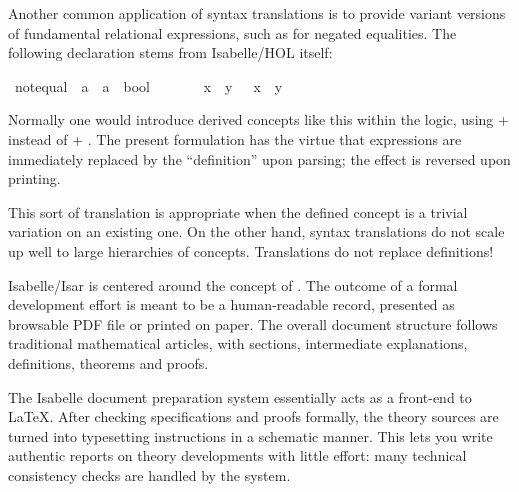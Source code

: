 \begin{isabellebody}
\begin{isamarkuptext}
  \medskip Another common application of syntax translations is to
  provide variant versions of fundamental relational expressions, such
  as \isa{{\isasymnoteq}} for negated equalities.  The following declaration
  stems from Isabelle/HOL itself:%
\end{isamarkuptext}%
\isamarkuptrue%
\isamarkupfalse%
\ {\isachardoublequoteopen}{\isacharunderscore}not{\isacharunderscore}equal{\isachardoublequoteclose}\ {\isacharcolon}{\isacharcolon}\ {\isachardoublequoteopen}{\isacharprime}a\ {\isasymRightarrow}\ {\isacharprime}a\ {\isasymRightarrow}\ bool{\isachardoublequoteclose}\ \ \ \ {\isacharparenleft}\ {\isachardoublequoteopen}{\isasymnoteq}{\isasymignore}{\isachardoublequoteclose}\ {}{}{\isacharparenright}\isanewline
{}\isamarkupfalse%
\ {\isachardoublequoteopen}x\ {\isasymnoteq}{\isasymignore}\ y{\isachardoublequoteclose}\ {\isasymrightleftharpoons}\ {\isachardoublequoteopen}{\isasymnot}\ {\isacharparenleft}x\ {\isacharequal}\ y{\isacharparenright}{\isachardoublequoteclose}%
\begin{isamarkuptext}%
\noindent Normally one would introduce derived concepts like this
  within the logic, using  + 
  instead of  + .  The
  present formulation has the virtue that expressions are immediately
  replaced by the ``definition'' upon parsing; the effect is reversed
  upon printing.

  This sort of translation is appropriate when the defined concept is
  a trivial variation on an existing one.  On the other hand, syntax
  translations do not scale up well to large hierarchies of concepts.
  Translations do not replace definitions!%
\end{isamarkuptext}%
\isamarkuptrue%
%
\isamarkuptrue%
%
\begin{isamarkuptext}%
Isabelle/Isar is centered around the concept of .  The outcome of a formal
  development effort is meant to be a human-readable record, presented
  as browsable PDF file or printed on paper.  The overall document
  structure follows traditional mathematical articles, with sections,
  intermediate explanations, definitions, theorems and proofs.

  \medskip The Isabelle document preparation system essentially acts
  as a front-end to {\LaTeX}.  After checking specifications and
  proofs formally, the theory sources are turned into typesetting
  instructions in a schematic manner.  This lets you write authentic
  reports on theory developments with little effort: many technical
  consistency checks are handled by the system.


\end{isamarkuptext}
\end{isabellebody}
